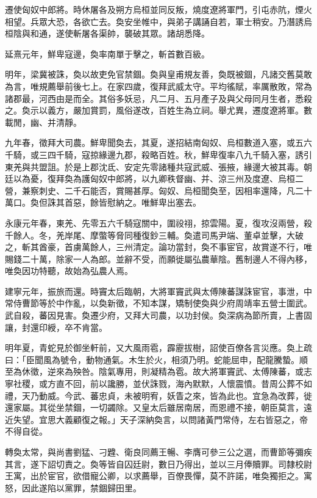 \begin{pinyinscope}
遷使匈奴中郎將。時休屠各及朔方烏桓並同反叛，燒度遼將軍門，引屯赤阬，煙火相望。兵眾大恐，各欲亡去。奐安坐帷中，與弟子講誦自若，軍士稍安。乃潛誘烏桓陰與和通，遂使斬屠各渠帥，襲破其眾。諸胡悉降。

延熹元年，鮮卑寇邊，奐率南單于擊之，斬首數百級。

明年，梁冀被誅，奐以故吏免官禁錮。奐與皇甫規友善，奐既被錮，凡諸交舊莫敢為言，唯規薦舉前後七上。在家四歲，復拜武威太守。平均徭賦，率厲散敗，常為諸郡最，河西由是而全。其俗多妖忌，凡二月、五月產子及與父母同月生者，悉殺之。奐示以義方，嚴加賞罰，風俗遂改，百姓生為立祠。舉尤異，遷度遼將軍。數載閒，幽、并清靜。

九年春，徵拜大司農。鮮卑聞奐去，其夏，遂招結南匈奴、烏桓數道入塞，或五六千騎，或三四千騎，寇掠緣邊九郡，殺略百姓。秋，鮮卑復率八九千騎入塞，誘引東羌與共盟詛。於是上郡沈氐、安定先零諸種共寇武威、張掖，緣邊大被其毒。朝廷以為憂，復拜奐為護匈奴中郎將，以九卿秩督幽、并、涼三州及度遼、烏桓二營，兼察刺史、二千石能否，賞賜甚厚。匈奴、烏桓聞奐至，因相率還降，凡二十萬口。奐但誅其首惡，餘皆慰納之。唯鮮卑出塞去。

永康元年春，東羌、先零五六千騎寇關中，圍祋祤，掠雲陽。夏，復攻沒兩營，殺千餘人。冬，羌岸尾、摩蟞等脅同種復鈔三輔。奐遣司馬尹端、董卓並擊，大破之，斬其酋豪，首虜萬餘人，三州清定。論功當封，奐不事宦官，故賞遂不行，唯賜錢二十萬，除家一人為郎。並辭不受，而願徙屬弘農華陰。舊制邊人不得內移，唯奐因功特聽，故始為弘農人焉。

建寧元年，振旅而還。時竇太后臨朝，大將軍竇武與太傅陳蕃謀誅宦官，事泄，中常侍曹節等於中作亂，以奐新徵，不知本謀，矯制使奐與少府周靖率五營士圍武。武自殺，蕃因見害。奐遷少府，又拜大司農，以功封侯。奐深病為節所賣，上書固讓，封還印綬，卒不肯當。

明年夏，青蛇見於御坐軒前，又大風雨雹，霹靂拔樹，詔使百僚各言災應。奐上疏曰：「臣聞風為號令，動物通氣。木生於火，相須乃明。蛇能屈申，配龍騰蟄。順至為休徵，逆來為殃咎。陰氣專用，則凝精為雹。故大將軍竇武、太傅陳蕃，或志寧社稷，或方直不回，前以讒勝，並伏誅戮，海內默默，人懷震憤。昔周公葬不如禮，天乃動威。今武、蕃忠貞，未被明宥，妖眚之來，皆為此也。宜急為改葬，徙還家屬。其從坐禁錮，一切蠲除。又皇太后雖居南居，而恩禮不接，朝臣莫言，遠近失望。宜思大義顧復之報。」天子深納奐言，以問諸黃門常侍，左右皆惡之，帝不得自從。

轉奐太常，與尚書劉猛、刁韙、衛良同薦王暢、李膺可參三公之選，而曹節等彌疾其言，遂下詔切責之。奐等皆自囚廷尉，數日乃得出，並以三月俸贖罪。司隸校尉王寓，出於宦官，欲借寵公卿，以求薦舉，百僚畏憚，莫不許諾，唯奐獨拒之。寓怒，因此遂陷以黨罪，禁錮歸田里。


\end{pinyinscope}
